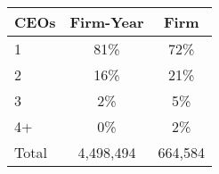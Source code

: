 \begin{tabular}{lcc}
\toprule
CEOs & Firm-Year & Firm \\
\midrule
1 & 81\% & 72\% \\
2 & 16\% & 21\% \\
3 & 2\% & 5\% \\
4+ & 0\% & 2\% \\
Total &    4,498,494 &      664,584 \\
\bottomrule
\end{tabular}
